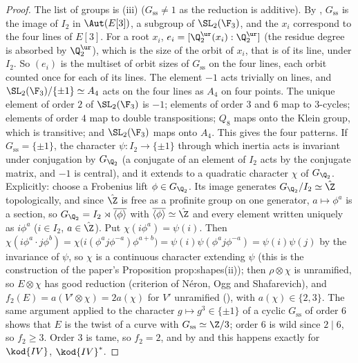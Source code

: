 \begin{proof}
The list of groups is (iii) ($G_{\mathrm{ss}}\ne1$ as the reduction is additive). By
, $G_{\mathrm{ss}}$ is the image of $I_2$ in $\Aut(E[3])$, a subgroup of $\SL_2(\F_3)$, and the
$x_i$ correspond to the four lines of $E[3]$. For a root $x_i$, $e_i=[\Q_2^{\ur}(x_i):\Q_2^{\ur}]$ (the residue degree is absorbed by
$\Q_2^{\ur}$), which is the size of the orbit of $x_i$, that is of its line, under $I_2$. So $(e_i)$ is the multiset of orbit sizes of
$G_{\mathrm{ss}}$ on the four lines, each orbit counted once for each of its lines. The element $-1$ acts trivially on lines, and
$\SL_2(\F_3)/\{\pm1\}\simeq A_4$ acts on the four lines as $A_4$ on four points. The unique element of order $2$ of $\SL_2(\F_3)$ is
$-1$; elements of order $3$ and $6$ map to $3$-cycles; elements of order $4$ map to double transpositions; $Q_8$ maps onto the
Klein group, which is transitive; and $\SL_2(\F_3)$ maps onto $A_4$. This gives the four patterns. If $G_{\mathrm{ss}}=\{\pm1\}$, the
character $\psi\colon I_2\to\{\pm1\}$ through which inertia acts is invariant under conjugation by $G_{\Q_2}$ (a conjugate of an element of $I_2$ acts
by the conjugate matrix, and $-1$ is central), and it extends to a quadratic character $\chi$ of $G_{\Q_2}$. Explicitly: choose a
Frobenius lift $\phi\in G_{\Q_2}$. Its image generates $G_{\Q_2}/I_2\simeq\hat\Z$ topologically, and since $\hat\Z$ is free as a
profinite group on one generator, $a\mapsto\phi^a$ is a section, so $G_{\Q_2}=I_2\rtimes\overline{\langle\phi\rangle}$ with
$\overline{\langle\phi\rangle}\simeq\hat\Z$ and every element written uniquely as $i\phi^a$ ($i\in I_2$, $a\in\hat\Z$). Put
$\chi(i\phi^a)=\psi(i)$. Then $\chi(i\phi^a\cdot j\phi^b)=\chi\bigl(i(\phi^aj\phi^{-a})\phi^{a+b}\bigr)=\psi(i)\psi(\phi^aj\phi^{-a})=\psi(i)\psi(j)$
by the invariance of $\psi$, so $\chi$ is a continuous character extending $\psi$ (this is the construction of the paper's
Proposition prop:shapes(ii)); then
$\rho\otimes\chi$ is unramified, so $E\otimes\chi$ has good reduction (criterion of N\'eron, Ogg and Shafarevich), and
$f_2(E)=a(V'\otimes\chi)=2a(\chi)$ for $V'$ unramified (), with $a(\chi)\in\{2,3\}$. The same argument applied to the
character $g\mapsto g^3\in\{\pm1\}$ of a cyclic $G_{\mathrm{ss}}$ of order $6$ shows that $E$ is the twist of a curve with
$G_{\mathrm{ss}}\simeq\Z/3$; order $6$ is wild since $2\mid6$, so $f_2\ge3$. Order $3$ is tame, so $f_2=2$, and by
 and  this happens exactly for $\kod{IV}$, $\kod{IV}^*$.
\end{proof}

